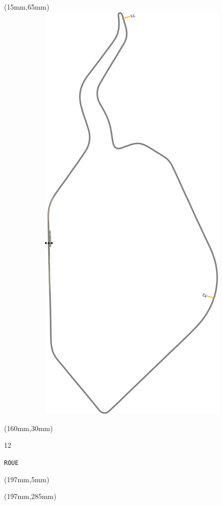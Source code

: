 \begin{textblock*}{185mm}(15mm,65mm)%
\centering
\mbox{\includegraphics[width=185mm,height=210mm,keepaspectratio]{PT/ROUE.pdf}}
\end{textblock*}
\begin{textblock*}{40mm}(160mm,30mm)%
\Large
\par{} 
\par12 
\par\hfill\tiny\tt ROUE\\
\end{textblock*}
\begin{textblock*}{20mm}(197mm,5mm)%
\fbox{\thepage}
\label{ROUE}
\end{textblock*}
\begin{textblock*}{20mm}(197mm,285mm)%
\fbox{\thepage}
\end{textblock*}

